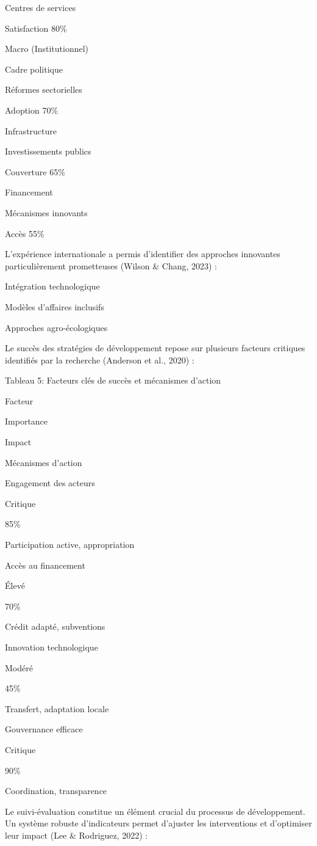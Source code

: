 \documentclass[12pt,oneside]{report}
\begin{document}
Centres de services

Satisfaction 80\%

Macro (Institutionnel)

Cadre politique

Réformes sectorielles

Adoption 70\%

Infrastructure

Investissements publics

Couverture 65\%

Financement

Mécanismes innovants

Accès 55\%

L'expérience internationale a permis d'identifier des approches innovantes particulièrement prometteuses (Wilson \& Chang, 2023) :

Intégration technologique

Modèles d'affaires inclusifs

Approches agro-écologiques

Le succès des stratégies de développement repose sur plusieurs facteurs critiques identifiés par la recherche (Anderson et al., 2020) :

Tableau 5: Facteurs clés de succès et mécanismes d'action

Facteur

Importance

Impact

Mécanismes d'action

Engagement des acteurs

Critique

85\%

Participation active, appropriation

Accès au financement

Élevé

70\%

Crédit adapté, subventions

Innovation technologique

Modéré

45\%

Transfert, adaptation locale

Gouvernance efficace

Critique

90\%

Coordination, transparence

Le suivi-évaluation constitue un élément crucial du processus de développement. Un système robuste d'indicateurs permet d'ajuster les interventions et d'optimiser leur impact (Lee \& Rodriguez, 2022) :
\end{document}
